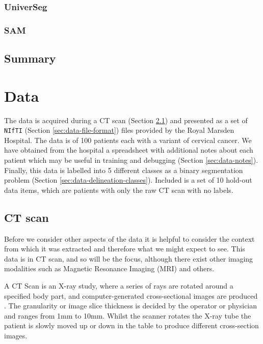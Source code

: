\documentclass[11pt,twoside]{report}
\begin{document}
\subsection{UniverSeg}\label{sect:universeg}

\subsection{SAM}\label{sect:sam}

\section{Summary}\label{sect:background-summary}

\chapter{Data}\label{sect:data}

The data is acquired during a CT scan (Section \ref{sec:data-ct-scan}) and presented as a set of \texttt{NIfTI} (Section \ref{sec:data-file-format}) files provided by the Royal Marsden Hospital. The data is of 100 patients each with a variant of cervical cancer. We have obtained from the hospital a spreadsheet with additional notes about each patient which may be useful in training and debugging (Section \ref{sec:data-notes}). Finally, this data is labelled into 5 different classes as a binary segmentation problem (Section \ref{sec:data-delineation-classes}). Included is a set of 10 hold-out data items, which are patients with only the raw CT scan with no labels.

\section{CT scan}\label{sec:data-ct-scan}

Before we consider other aspects of the data it is helpful to consider the context from which it was extracted and therefore what we might expect to see. This data is in CT scan, and so will be the focus, although there exist other imaging modalities such as Magnetic Resonance Imaging (MRI) and others.

A CT Scan is an X-ray study, where a series of rays are rotated around a specified body part, and computer-generated cross-sectional images are produced \cite{file-formats}. The granularity or image slice thickness is decided by the operator or physician and ranges from 1mm to 10mm. Whilst the scanner rotates the X-ray tube the patient is slowly moved up or down in the table to produce different cross-section images. 
 
\end{document}
